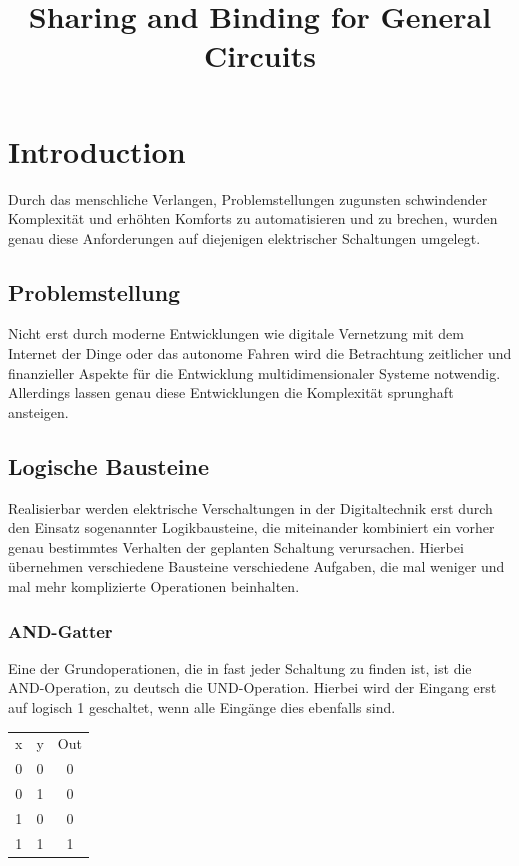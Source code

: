 \documentclass[conference]{IEEEtran}
\begin{document}
\begin{titlepage}

\title{Sharing and Binding for General Circuits\\}

\author{
}
\maketitle
\begin{abstract}

\end{abstract}
\end{titlepage}


\newpage
\section{Introduction}
Durch das menschliche Verlangen, Problemstellungen zugunsten schwindender Komplexität und erhöhten Komforts zu automatisieren und zu brechen, wurden genau diese Anforderungen auf diejenigen elektrischer Schaltungen umgelegt. 
\subsection{Problemstellung}
Nicht erst durch moderne Entwicklungen wie digitale Vernetzung mit dem Internet der Dinge  oder das autonome Fahren wird die Betrachtung zeitlicher und finanzieller Aspekte für die Entwicklung multidimensionaler Systeme notwendig. Allerdings lassen genau diese Entwicklungen die Komplexität sprunghaft ansteigen.

\subsection{Logische Bausteine}
Realisierbar werden elektrische Verschaltungen in der Digitaltechnik erst durch den Einsatz sogenannter Logikbausteine, die miteinander kombiniert ein vorher genau bestimmtes Verhalten der geplanten Schaltung verursachen.
Hierbei übernehmen verschiedene Bausteine verschiedene Aufgaben, die mal weniger und mal mehr komplizierte Operationen beinhalten. 
\subsubsection{AND-Gatter}
Eine der Grundoperationen, die in fast jeder Schaltung zu finden ist, ist die AND-Operation, zu deutsch die UND-Operation. Hierbei wird der Eingang erst auf logisch 1 geschaltet, wenn alle Eingänge dies ebenfalls sind.\\
\begin{tabular}[h]{ccc}
x&y&Out\\
0&0&0\\
0&1&0\\
1&0&0\\
1&1&1\\
\end{tabular}
\end{document}
